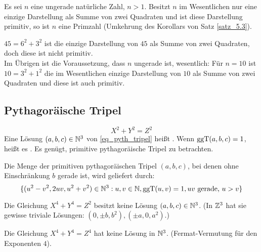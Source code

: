 	Es sei $n$  eine ungerade natürliche Zahl, $n > 1$. Besitzt $n$ im Wesentlichen nur eine einzige Darstellung als Summe von zwei Quadraten und ist diese Darstellung primitiv, so ist $n$ eine Primzahl (Umkehrung des Korollars von Satz \ref{satz_5.3}).
	
	$45 = 6^2 + 3^2$ ist die einzige Darstellung von $45$ als Summe von zwei Quadraten, doch diese ist nicht primitiv. \\
	Im Übrigen ist die Voraussetzung, dass $n$ ungerade ist, wesentlich: Für $n = 10$ ist $10 = 3^2 + 1^2$ die im Wesentlichen einzige Darstellung von $10$ als Summe von zwei Quadraten und diese ist auch primitiv.
	
\subsection{Pythagoräische Tripel}
	\begin{equation}
		X^2 + Y^2 = Z^2 \label{eq_pyth_tripel}
	\end{equation}
	Eine Lösung $(a,b,c) \in \mathbb{N}^3$ von \eqref{eq_pyth_tripel} heißt . Wenn $\operatorname{ggT}(a,b,c) = 1$, heißt es . Es genügt, primitive pythagoräische Tripel zu betrachten.
	
\begin{falko} \label{F5.2}
	Die Menge der primitiven pythagoräischen Tripel $(a,b,c)$, bei denen ohne Einschränkung $b$ gerade ist, wird geliefert durch:
	\begin{equation}
		\{ (u^2-v^2,2uv,u^2+v^2) \in \mathbb{N}^3 : u,v \in \mathbb{N}, \operatorname{ggT}(u,v) = 1, uv \text{ gerade, } u>v \} \label{eq_pyth_tripel2}
	\end{equation}
\end{falko}

\begin{falko}
	Die Gleichung $X^4+Y^4 = Z^2$ besitzt keine Lösung $(a,b,c) \in \mathbb{N}^3$. (In $\mathbb{Z}^3$ hat sie gewisse triviale Lösungen: $(0, \pm b, b^2), (\pm a, 0, a^2)$.)
\end{falko}

	Die Gleichung $X^4+Y^4=Z^4$ hat keine Lösung in $\mathbb{N}^3$. (Fermat-Vermutung für den Exponenten $4$).
	
